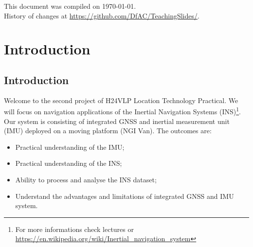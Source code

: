 \documentclass[11pt,fleqn]{book} %
\begin{document}
\noindent This document was compiled on \today. \\ 
History of changes at \url{https://github.com/DfAC/TeachingSlides/}.


\pagestyle{empty} %
\tableofcontents %

\cleardoublepage %
\pagestyle{fancy} %


\part{Introduction}


\chapter{Introduction}

Welcome to the second project of H24VLP Location Technology Practical. We will focus on navigation applications of the Inertial Navigation Systems (INS)\footnote{For more informations check lectures or \url{https://en.wikipedia.org/wiki/Inertial_navigation_system}}. Our system is consisting of integrated GNSS and inertial measurement unit (IMU) deployed on a moving platform (NGI Van). The outcomes are:

\begin{itemize}
	\item Practical understanding of the IMU;
	\item Practical understanding of the INS;
	\item Ability to process and analyse the INS dataset;
	\item Understand the advantages and limitations of integrated GNSS and IMU system.

\end{itemize}
\end{document}
